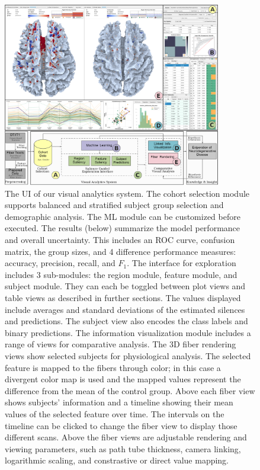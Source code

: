 \begin{figure}[ht]
    \centering
    \includegraphics[width=0.85\textwidth]{images/SystemVersion2.png} 
    \caption{The UI of our visual analytics system.  The cohort selection module supports balanced and stratified subject group selection and demographic analysis.  The ML module can be customized before executed. The results (below) summarize the model performance and overall uncertainty. This includes an ROC curve, confusion matrix, the group sizes, and 4 difference performance measures: accuracy, precision, recall, and $F_1$.  The interface for exploration includes 3 sub-modules: the region module, feature module, and subject module. They can each be toggled between plot views and table views as described in further sections. The values displayed include averages and standard deviations of the estimated silences and predictions. The subject view also encodes the class labels and binary predictions.  The information visualization module includes a range of views for comparative analysis.  The 3D fiber rendering views show selected subjects for physiological analysis.  The selected feature is mapped to the fibers through color; in this case a divergent color map is used and the mapped values represent the difference from the mean of the control group. Above each fiber view shows subjects' information and a timeline showing their mean values of the selected feature over time. The intervals on the timeline can be clicked to change the fiber view to display those different scans. Above the fiber views are adjustable rendering and viewing parameters, such as path tube thickness, camera linking, logarithmic scaling, and constrastive or direct value mapping.
    }
    \label{fig:system}
\end{figure}


